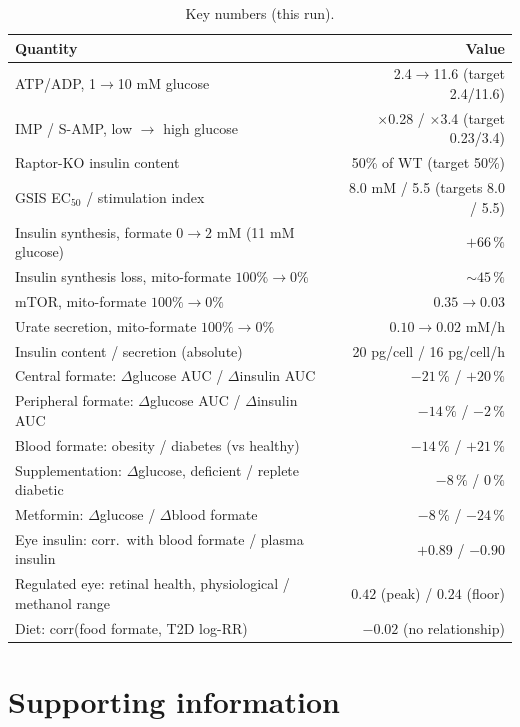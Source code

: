\documentclass[10pt,letterpaper]{article}
\begin{document}
\begin{table}[h]
  \centering
  \small
  \caption{Key numbers (this run).}
  \label{tab:key}
  \begin{tabular}{@{}lr@{}}
    \toprule
    Quantity & Value \\
    \midrule
    ATP/ADP, 1$\rightarrow$10 mM glucose~\cite{detimary1998} & 2.4$\rightarrow$11.6 (target 2.4/11.6) \\
    IMP / S-AMP, low $\rightarrow$ high glucose~\cite{gooding2015} & $\times$0.28 / $\times$3.4 (target 0.23/3.4) \\
    Raptor-KO insulin content~\cite{ni2017} & 50\% of WT (target 50\%) \\
    GSIS EC$_{50}$ / stimulation index & 8.0 mM / 5.5 (targets 8.0 / 5.5) \\
    Insulin synthesis, formate $0\rightarrow2$ mM (11 mM glucose) & $+66\,\%$ \\
    Insulin synthesis loss, mito-formate $100\%\rightarrow0\%$ & ${\sim}45\,\%$ \\
    mTOR, mito-formate $100\%\rightarrow0\%$ & $0.35\rightarrow0.03$ \\
    Urate secretion, mito-formate $100\%\rightarrow0\%$ & $0.10\rightarrow0.02$ mM/h \\
    Insulin content / secretion (absolute) & 20 pg/cell / 16 pg/cell/h \\
    Central formate: $\Delta$glucose AUC / $\Delta$insulin AUC & $-21\,\%$ / $+20\,\%$ \\
    Peripheral formate: $\Delta$glucose AUC / $\Delta$insulin AUC & $-14\,\%$ / $-2\,\%$ \\
    Blood formate: obesity / diabetes (vs healthy) & $-14\,\%$ / $+21\,\%$ \\
    Supplementation: $\Delta$glucose, deficient / replete diabetic & $-8\,\%$ / $0\,\%$ \\
    Metformin: $\Delta$glucose / $\Delta$blood formate & $-8\,\%$ / $-24\,\%$ \\
    Eye insulin: corr.\ with blood formate / plasma insulin & $+0.89$ / $-0.90$ \\
    Regulated eye: retinal health, physiological / methanol range & $0.42$ (peak) / $0.24$ (floor) \\
    Diet: corr(food formate, T2D log-RR) & $-0.02$ (no relationship) \\
    \bottomrule
  \end{tabular}
\end{table}
\section*{Supporting information}
\end{document}
